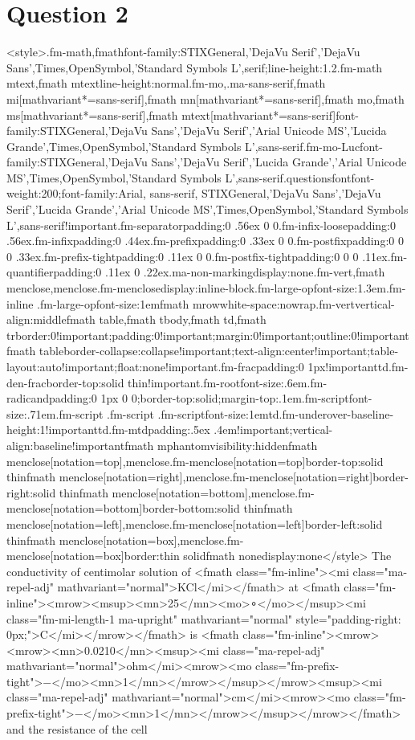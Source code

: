\documentclass{article}
\begin{document}
\section*{Question 2}
<style>.fm-math,fmath{font-family:STIXGeneral,'DejaVu Serif','DejaVu Sans',Times,OpenSymbol,'Standard Symbols L',serif;line-height:1.2}.fm-math mtext,fmath mtext{line-height:normal}.fm-mo,.ma-sans-serif,fmath mi[mathvariant*=sans-serif],fmath mn[mathvariant*=sans-serif],fmath mo,fmath ms[mathvariant*=sans-serif],fmath mtext[mathvariant*=sans-serif]{font-family:STIXGeneral,'DejaVu Sans','DejaVu Serif','Arial Unicode MS','Lucida Grande',Times,OpenSymbol,'Standard Symbols L',sans-serif}.fm-mo-Luc{font-family:STIXGeneral,'DejaVu Sans','DejaVu Serif','Lucida Grande','Arial Unicode MS',Times,OpenSymbol,'Standard Symbols L',sans-serif}.questionsfont{font-weight:200;font-family:Arial, sans-serif, STIXGeneral,'DejaVu Sans','DejaVu Serif','Lucida Grande','Arial Unicode MS',Times,OpenSymbol,'Standard Symbols L',sans-serif!important}.fm-separator{padding:0 .56ex 0 0}.fm-infix-loose{padding:0 .56ex}.fm-infix{padding:0 .44ex}.fm-prefix{padding:0 .33ex 0 0}.fm-postfix{padding:0 0 0 .33ex}.fm-prefix-tight{padding:0 .11ex 0 0}.fm-postfix-tight{padding:0 0 0 .11ex}.fm-quantifier{padding:0 .11ex 0 .22ex}.ma-non-marking{display:none}.fm-vert,fmath menclose,menclose.fm-menclose{display:inline-block}.fm-large-op{font-size:1.3em}.fm-inline .fm-large-op{font-size:1em}fmath mrow{white-space:nowrap}.fm-vert{vertical-align:middle}fmath table,fmath tbody,fmath td,fmath tr{border:0!important;padding:0!important;margin:0!important;outline:0!important}fmath table{border-collapse:collapse!important;text-align:center!important;table-layout:auto!important;float:none!important}.fm-frac{padding:0 1px!important}td.fm-den-frac{border-top:solid thin!important}.fm-root{font-size:.6em}.fm-radicand{padding:0 1px 0 0;border-top:solid;margin-top:.1em}.fm-script{font-size:.71em}.fm-script .fm-script .fm-script{font-size:1em}td.fm-underover-base{line-height:1!important}td.fm-mtd{padding:.5ex .4em!important;vertical-align:baseline!important}fmath mphantom{visibility:hidden}fmath menclose[notation=top],menclose.fm-menclose[notation=top]{border-top:solid thin}fmath menclose[notation=right],menclose.fm-menclose[notation=right]{border-right:solid thin}fmath menclose[notation=bottom],menclose.fm-menclose[notation=bottom]{border-bottom:solid thin}fmath menclose[notation=left],menclose.fm-menclose[notation=left]{border-left:solid thin}fmath menclose[notation=box],menclose.fm-menclose[notation=box]{border:thin solid}fmath none{display:none}</style> The conductivity of centimolar solution of <fmath class="fm-inline"><mi class="ma-repel-adj" mathvariant="normal">KCl</mi></fmath> at <fmath class="fm-inline"><mrow><msup><mn>25</mn><mo>∘</mo></msup><mi class="fm-mi-length-1 ma-upright" mathvariant="normal" style="padding-right: 0px;">C</mi></mrow></fmath> is <fmath class="fm-inline"><mrow><mrow><mn>0.0210</mn><msup><mi class="ma-repel-adj" mathvariant="normal">ohm</mi><mrow><mo class="fm-prefix-tight">−</mo><mn>1</mn></mrow></msup></mrow><msup><mi class="ma-repel-adj" mathvariant="normal">cm</mi><mrow><mo class="fm-prefix-tight">−</mo><mn>1</mn></mrow></msup></mrow></fmath> and the resistance of the cell 
\end{document}
